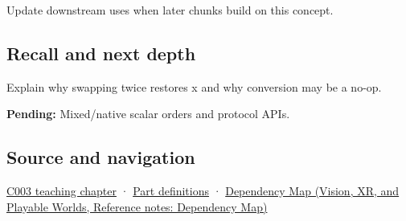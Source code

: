 \hypertarget{appendix-11ba36693aa2-used-by}{}

Update downstream uses when later chunks build on this concept.

\subsection{Recall and next depth}\label{appendix-11ba36693aa2-recall-and-next-depth}

\hypertarget{appendix-11ba36693aa2-recall-and-next-depth}{}

Explain why swapping twice restores x and why conversion may be a no-op.

\textbf{Pending:} Mixed/native scalar orders and protocol APIs.

\subsection{Source and navigation}\label{appendix-11ba36693aa2-source-and-navigation}

\hypertarget{appendix-11ba36693aa2-source-and-navigation}{}

\hyperref[01-foundations-i-ch002-where-the-bytes-live]{C003 teaching chapter} · \hyperref[appendix-fd090d982a15-m003---parts-41-60]{Part definitions} · \href{../07-Vision-XR-and-Playable-Worlds/main.pdf\#nameddest=appendix-4ad47bdd269a}{Dependency Map (Vision, XR, and Playable Worlds, Reference notes: Dependency Map)}
